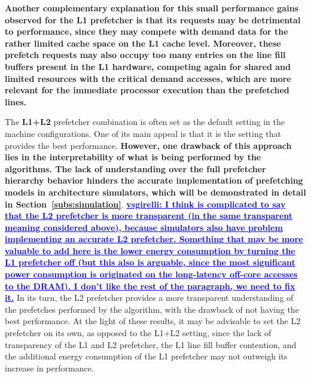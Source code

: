\documentclass[AMA,final,STIX1COL]{WileyNJD-v2}
\newcommand{\ms}[1]{\textcolor{orange}{\bfseries \ul{ msserpa: #1} }\vspace{0.2cm}}
\newcommand{\vsg}[1]{\textcolor{blue}{\bfseries \ul{vsgirelli: #1} }\vspace{0.2cm}}
\newcommand{\fbm}[1]{\textcolor{red}{\bfseries \ul{fbm: #1} }\vspace{0.2cm}}
\begin{document}
\textbf{Another complementary explanation for this small performance gains observed for the L1 prefetcher is that its requests may be detrimental to performance, since they may compete with demand data for the rather limited cache space on the L1 cache level.
Moreover, these prefetch requests may also occupy too many entries on the line fill buffers present in the L1 hardware, competing again for shared and limited resources with the critical demand accesses, which are more relevant for the immediate processor execution than the prefetched lines.}%

The \textbf{L1+L2} prefetcher combination is often set as the default setting in the machine configurations.
One of its main appeal is that it is the setting that provides the best performance. 
\textbf{However, one drawback of this approach lies in the interpretability of what is being performed by the algorithms.
The lack of understanding over the full prefetcher hierarchy behavior hinders the accurate implementation of prefetching models in architecture simulators, which will be demonstrated in detail in Section~\ref{subs:simulation}}.%
\vsg{I think is complicated to say that the L2 prefetcher is more transparent (in the same transparent meaning considered above), because simulators also have problem implementing an accurate L2 prefetcher. Something that may be more valuable to add here is the lower energy consumption by turning the L1 prefetcher off (but this also is arguable, since the most significant power consumption is originated on the long-latency off-core accesses to the DRAM). I don't like the rest of the paragraph, we need to fix it.}
In its turn, the L2 prefetcher provides a more transparent understanding of the prefetches performed by the algorithm, with the drawback of not having the best performance.
At the light of these results, it may be advisable to set the L2 prefetcher on its own, as opposed to the L1+L2 setting, since the lack of transparency of the L1 and L2 prefetcher, the L1 line fill buffer contention, and the additional energy consumption of the L1 prefetcher may not outweigh its increase in performance.%
\end{document}

